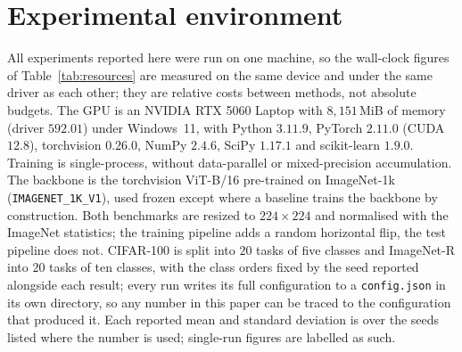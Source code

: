 \clearpage

\section{Experimental environment}
\label{app:env}

All experiments reported here were run on one machine, so the wall-clock figures of
Table~\ref{tab:resources} are measured on the same device and under the same driver as each
other; they are relative costs between methods, not absolute budgets.
The GPU is an NVIDIA RTX 5060 Laptop with $8{,}151$\,MiB of memory (driver $592.01$) under
Windows~11, with Python $3.11.9$, PyTorch $2.11.0$ (CUDA $12.8$), torchvision $0.26.0$,
NumPy $2.4.6$, SciPy $1.17.1$ and scikit-learn $1.9.0$. Training is single-process, without
data-parallel or mixed-precision accumulation.
The backbone is the torchvision ViT-B/16 pre-trained on ImageNet-1k
(\texttt{IMAGENET\_1K\_V1}), used frozen except where a baseline trains the backbone by
construction. Both benchmarks are resized to $224\times224$ and normalised with the ImageNet
statistics; the training pipeline adds a random horizontal flip, the test pipeline does not.
CIFAR-100 is split into $20$ tasks of five classes and ImageNet-R into $20$ tasks of ten
classes, with the class orders fixed by the seed reported alongside each result; every run
writes its full configuration to a \texttt{config.json} in its own directory, so any number
in this paper can be traced to the configuration that produced it.
Each reported mean and standard deviation is over the seeds listed where the number is used;
single-run figures are labelled as such.
